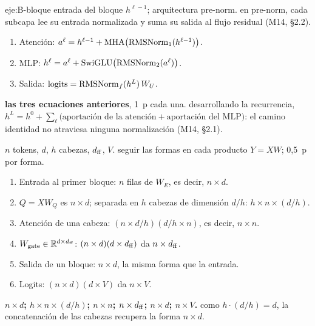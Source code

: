 \begin{solucion}{eje:B-bloque}
\datos entrada del bloque $h^{\ell-1}$; arquitectura pre-norm.
\planteamiento en pre-norm, cada subcapa lee su entrada normalizada y suma su salida al flujo residual (M14, §2.2).
\pasos
\begin{enumerate}[label=\arabic*.]
  \item Atención: $a^{\ell}=h^{\ell-1}+\operatorname{MHA}\bigl(\operatorname{RMSNorm}_1(h^{\ell-1})\bigr)$.
  \item MLP: $h^{\ell}=a^{\ell}+\operatorname{SwiGLU}\bigl(\operatorname{RMSNorm}_2(a^{\ell})\bigr)$.
  \item Salida: $\mathrm{logits}=\operatorname{RMSNorm}_f(h^{L})\,W_U$.
\end{enumerate}
\resultado \textbf{las tres ecuaciones anteriores}, 1~p cada una.
\comprobacion desarrollando la recurrencia, $h^{L}=h^{0}+\sum_{\ell}\bigl(\text{aportación de la atención}+\text{aportación del MLP}\bigr)$: el camino identidad no atraviesa ninguna normalización (M14, §2.1).

\datos $n$ tokens, $d$, $h$ cabezas, $d_{\mathrm{ff}}$, $V$.
\planteamiento seguir las formas en cada producto $Y=XW$; 0,5~p por forma.
\pasos
\begin{enumerate}[label=\arabic*.]
  \item Entrada al primer bloque: $n$ filas de $W_E$, es decir, $n\times d$.
  \item $Q=XW_Q$ es $n\times d$; separada en $h$ cabezas de dimensión $d/h$: $h\times n\times (d/h)$.
  \item Atención de una cabeza: $(n\times d/h)(d/h\times n)$, es decir, $n\times n$.
  \item $W_{\mathrm{gate}}\in\mathbb{R}^{d\times d_{\mathrm{ff}}}$: $(n\times d)(d\times d_{\mathrm{ff}})$ da $n\times d_{\mathrm{ff}}$.
  \item Salida de un bloque: $n\times d$, la misma forma que la entrada.
  \item Logits: $(n\times d)(d\times V)$ da $n\times V$.
\end{enumerate}
\resultado \textbf{$n\times d$; $h\times n\times(d/h)$; $n\times n$; $n\times d_{\mathrm{ff}}$; $n\times d$; $n\times V$.}
\comprobacion como $h\cdot(d/h)=d$, la concatenación de las cabezas recupera la forma $n\times d$.


\end{solucion}
